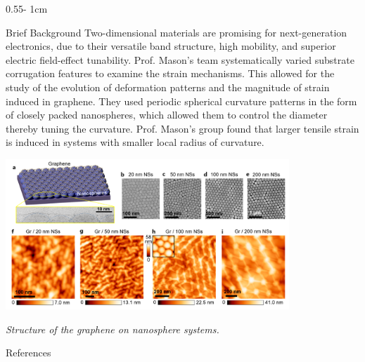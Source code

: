 \documentclass{../psuposter}
\begin{document}
\begin{frame}
\begin{columns}[t, totalwidth=\textwidth]
\begin{column}{0.55\textwidth - 1cm}
    \begin{block}{Brief Background}
    	 Two-dimensional materials are promising for next-generation electronics, due to their versatile band structure, high mobility, and superior electric field-effect tunability. Prof. Mason's team systematically varied substrate corrugation features to examine the strain mechanisms. This allowed for the study of the evolution of deformation patterns and the magnitude of strain induced in graphene. They used periodic spherical curvature patterns in the form of closely packed nanospheres, which allowed them to  control the diameter thereby tuning the curvature. Prof. Mason's group found  that larger tensile strain is induced in systems with smaller local radius of curvature. \cite{zhangStrainModulationGraphene2018}
        \begin{center}
		   	\includegraphics[width=0.8\textwidth]{images/background}    		

		\textit{Structure of the graphene on nanosphere systems. \cite{zhangStrainModulationGraphene2018}}
    	\end{center}
    \end{block}


\nocite{*}
    \begin{block}{References}
        
%        
		
    \end{block}

\end{column}
\end{columns}



\end{frame}
\end{document}
